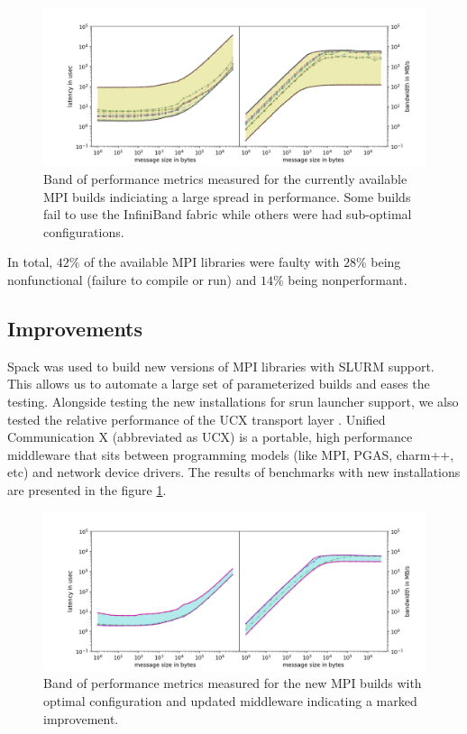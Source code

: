 \documentclass[sigconf,authordraft]{acmart}
\begin{document}
\begin{figure}[h]
	\centering
	\includegraphics[width=\linewidth]{curr_pearc}
	\caption{Band of performance metrics measured for the currently
			 available MPI builds indiciating a large spread in 
			 performance. Some builds fail to use the InfiniBand fabric while others were had sub-optimal configurations.}
	\label{fig:currmpi}
\end{figure}

In total, $42\%$ of the available MPI libraries were faulty with $28\%$ being nonfunctional (failure to compile or run) and $14\%$ being nonperformant.

\subsection{Improvements}
 
Spack\cite{spack} was used to build new versions of MPI libraries with SLURM support. This allows us to automate a large set of parameterized builds and eases the testing. Alongside testing the new installations for srun launcher support, we also tested the relative performance of the UCX transport layer \cite{shamis2015ucx,openucx-website}. Unified Communication X (abbreviated as UCX) is a portable, high performance middleware that sits between programming models (like MPI, PGAS, charm++, etc) and network device drivers. The results of benchmarks with new installations are presented in the figure \ref{fig:currmpi}. 

\begin{figure}[h]
	\centering
	\includegraphics[width=\linewidth]{new_pearc}
	\caption{Band of performance metrics measured for the new MPI builds
			with optimal configuration and updated middleware indicating
			a marked improvement.}
	\label{fig:newmpi}
\end{figure}
\end{document}
